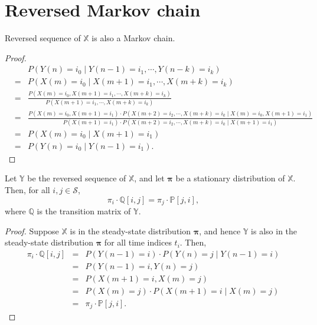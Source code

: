 \section{Reversed Markov chain}

\begin{observation}
Reversed sequence of $ \mathbb{X} $ is also a Markov chain.
\begin{proof}
\begin{eqnarray*}
&   & P(Y(n) = i_{0} \mid Y(n - 1) = i_{1}, \cdots, Y(n - k) = i_{k}) \\
& = & P(X(m) = i_{0} \mid X(m + 1) = i_{1}, \cdots, X(m + k) = i_{k}) \\
& = & \frac{P(X(m) = i_{0}, X(m + 1) = i_{1}, \cdots, X(m + k) = i_{k})}{P(X(m + 1) = i_{1}, \cdots, X(m + k) = i_{k})} \\
& = & \frac{P(X(m) = i_{0}, X(m + 1) = i_{1}) \cdot P(X(m + 2) = i_{2}, \cdots, X(m + k) = i_{k} \mid X(m) = i_{0}, X(m + 1) = i_{1})}{P(X(m + 1) = i_{1}) \cdot P(X(m + 2) = i_{2}, \cdots, X(m + k) = i_{k} \mid X(m + 1) = i_{1})} \\
& = & P(X(m) = i_{0} \mid X(m + 1) = i_{1}) \\
& = & P(Y(n) = i_{0} \mid Y(n - 1) = i_{1}).
\end{eqnarray*}
\end{proof}
\end{observation}

\begin{observation} \label{obs:pi_i-q_ij-eq-pi_j-p_ji}
Let $ \mathbb{Y} $ be the reversed sequence of $ \mathbb{X} $, and let $ \boldsymbol\pi $ be a stationary distribution of $ \mathbb{X} $. Then, for all $ i, j \in \mathcal{S} $,
\[ \pi_{i} \cdot \mathbb{Q}[i, j] = \pi_{j} \cdot \mathbb{P}[j, i], \]
where $ \mathbb{Q} $ is the transition matrix of $ \mathbb{Y} $.
\begin{proof}
Suppose $ \mathbb{X} $ is in the steady-state distribution $ \boldsymbol\pi $, and hence $ \mathbb{Y} $ is also in the steady-state distribution $ \boldsymbol\pi $ for all time indices $ t_{i} $. Then,
\begin{eqnarray*}
\pi_{i} \cdot \mathbb{Q}[i, j]
  & = & P(Y(n - 1) = i) \cdot P(Y(n) = j \mid Y(n - 1) = i) \\
  & = & P(Y(n - 1) = i, Y(n) = j) \\
  & = & P(X(m + 1) = i, X(m) = j) \\
  & = & P(X(m) = j) \cdot P(X(m + 1) = i \mid X(m) = j) \\
  & = & \pi_{j} \cdot \mathbb{P}[j, i].
\end{eqnarray*}
\end{proof}
\end{observation}

